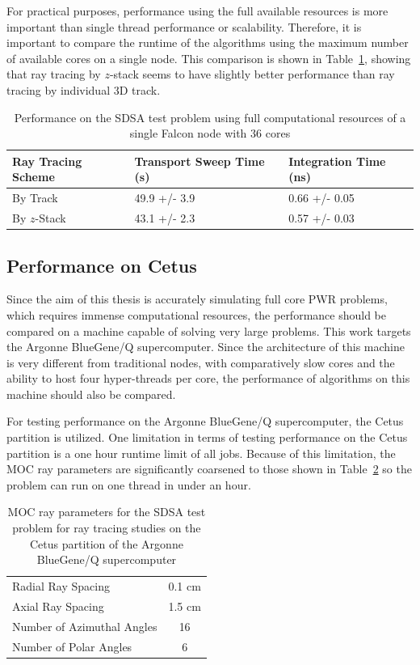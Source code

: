 For practical purposes, performance using the full available resources is more important than single thread performance or scalability. Therefore, it is important to compare the runtime of the algorithms using the maximum number of available cores on a single node. This comparison is shown in Table~\ref{tab:rt-full-thread}, showing that ray tracing by $z$-stack seems to have slightly better performance than ray tracing by individual 3D track.

\begin{table}[ht]
	\centering
	\caption{Performance on the SDSA test problem using full computational resources of a single Falcon node with 36 cores}
	\medskip
	\begin{tabular}{l|l|l}
		\hline
		Ray Tracing Scheme & Transport Sweep Time (s) & Integration Time (ns) \\
		\hline
		By Track & 49.9 +/- 3.9 & 0.66 +/- 0.05 \\
		By $z$-Stack & 43.1 +/- 2.3 & 0.57 +/- 0.03 \\
		\hline
	\end{tabular}
	\label{tab:rt-full-thread}
\end{table}

\subsection{Performance on Cetus}

Since the aim of this thesis is accurately simulating full core PWR problems, which requires immense computational resources, the performance should be compared on a machine capable of solving very large problems. This work targets the Argonne BlueGene/Q supercomputer. Since the architecture of this machine is very different from traditional nodes, with comparatively slow cores and the ability to host four hyper-threads per core, the performance of algorithms on this machine should also be compared.

For testing performance on the Argonne BlueGene/Q supercomputer, the Cetus partition is utilized. One limitation in terms of testing performance on the Cetus partition is a one hour runtime limit of all jobs. Because of this limitation, the \ac{MOC} ray parameters are significantly coarsened to those shown in Table~\ref{tab:rt-cetus-params} so the problem can run on one thread in under an hour.

\begin{table}[ht]
	\centering
	\caption{MOC ray parameters for the SDSA test problem for ray tracing studies on the Cetus partition of the Argonne BlueGene/Q supercomputer}
	\medskip
	\begin{tabular}{lc}
		\hline
		Radial Ray Spacing & 0.1 cm \\
		Axial Ray Spacing & 1.5 cm \\
		Number of Azimuthal Angles & 16 \\
		Number of Polar Angles & 6 \\
		\hline
	\end{tabular}
	\label{tab:rt-cetus-params}
\end{table}

